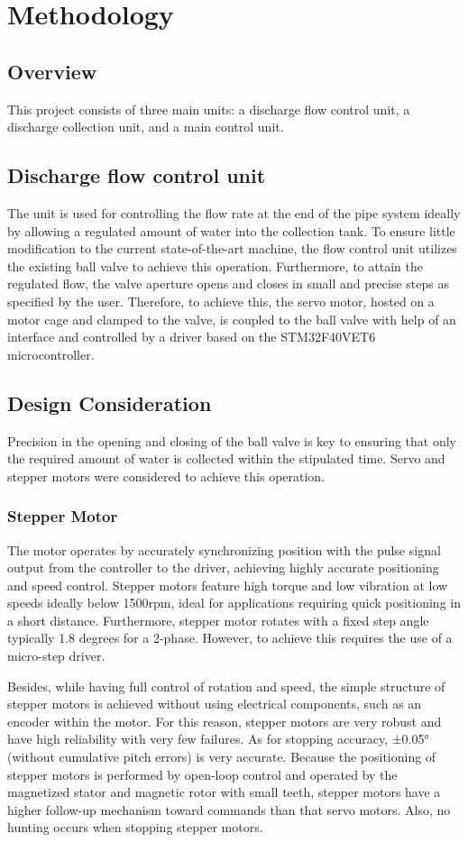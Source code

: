 \section{Methodology}
\subsection{Overview}
This project consists of three main units: a discharge flow control unit, a discharge collection  unit, and a main control unit. 
\subsection{Discharge flow control unit}
\par
The unit is used for controlling the flow rate at the end of the pipe system ideally by allowing a regulated amount of water into the collection tank. To ensure little modification to the current state-of-the-art machine, the flow control unit utilizes the existing ball valve to achieve this operation. Furthermore, to attain the regulated flow, the valve aperture opens and closes in small and precise steps as specified by the user. Therefore, to achieve this, the servo motor, hosted on a motor cage and clamped to the valve, is coupled to the ball valve with help of an interface and controlled by a driver based on the STM32F40VET6 microcontroller.  
\subsection{Design Consideration}
Precision in the opening and closing of the ball valve is key to ensuring that only the required amount of water is collected within the stipulated time. Servo and stepper motors were considered to achieve this operation.
\subsubsection{Stepper Motor}
\par
The motor operates by accurately synchronizing position with the pulse signal output from the controller to the driver, achieving highly accurate positioning and speed control. Stepper motors feature high torque and low vibration at low speeds ideally below 1500rpm, ideal for applications requiring quick positioning in a short distance. Furthermore, stepper motor rotates with a fixed step angle typically 1.8 degrees for a 2-phase. However, to achieve this requires the use of a micro-step driver.
\par
Besides, while having full control of rotation and speed, the simple structure of stepper motors is achieved without using electrical components, such as an encoder within the motor. For this reason, stepper motors are very robust and have high reliability with very few failures. As for stopping accuracy, ±0.05° (without cumulative pitch errors) is very accurate. Because the positioning of stepper motors is performed by open-loop control and operated by the magnetized stator and magnetic rotor with small teeth, stepper motors have a higher follow-up mechanism toward commands than that servo motors. Also, no hunting occurs when stopping stepper motors. 
